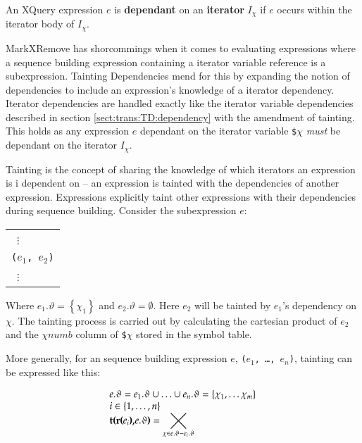\noindent
\begin{myDefinition}
An XQuery expression $e$ is \textbf{dependant} on an \textbf{iterator} $I_{\chi}$ if $e$ occurs within the iterator
body of $I_{\chi}$.
\label{def:iteratorDep}
\end{myDefinition}

MarkXRemove has shorcommings when it comes to evaluating expressions where a sequence building expression
containing a iterator variable reference is a subexpression. Tainting Dependencies mend for this by expanding the
notion of dependencies to include an expression's knowledge of a iterator dependency. Iterator dependencies are
handled exactly like the iterator variable dependencies described in section \ref{sect:trans:TD:dependency} with
the amendment of tainting. This holds as any expression $e$ dependant on the iterator variable \texttt{\$}$\chi$
\textit{must} be dependant on the iterator $I_{\chi}$.

Tainting is the concept of sharing the knowledge of which iterators an expression is i dependent on -- an
expression is tainted with the dependencies of another expression. Expressions explicitly taint other expressions
with their dependencies during sequence building. Consider the subexpression $e$:
\begin{center}
\begin{tabular}{l}
\quad \;\, $\vdots$  \\
\texttt{(}$e_{1}$\texttt{, }$e_{2}$\texttt{)}\\
\quad \;\, $\vdots$  
\end{tabular}
\end{center}
Where $e_{1}.\vartheta = \left\{\chi_{1}\right\}$ and $e_{2}.\vartheta = \emptyset$. Here $e_{2}$ will be tainted
by $e_{1}$'s dependency on $\chi$. The tainting process is carried out by calculating the cartesian product of
$e_{2}$ and the $\chi$$numb$ column of \texttt{\$}$\chi$ stored in the symbol table. 

More generally, for an sequence building expression $e$, \texttt{(}$e_{1}$\texttt{, \ldots, }$e_{n}$\texttt{)},
tainting can be expressed like this:
\begin{center}
\begin{equation}
\begin{array}{l}
e.\vartheta = e_{1}.\vartheta \cup \ldots \cup e_{n}.\vartheta = \left\{\chi_{1},\ldots\chi_{m}\right\} \\
i \in \left\{1,\ldots,n\right\} \\
\mbox{\textbf{t(r(}}e_{i}\mbox{\textbf{),}}e.\vartheta\mbox{\textbf{)}} = 
\displaystyle \varprod_{\chi \in e.\vartheta - e_{i}.\vartheta}
\end{array}
\label{eq:trans:TD:taint}
\end{equation}
\end{center}

